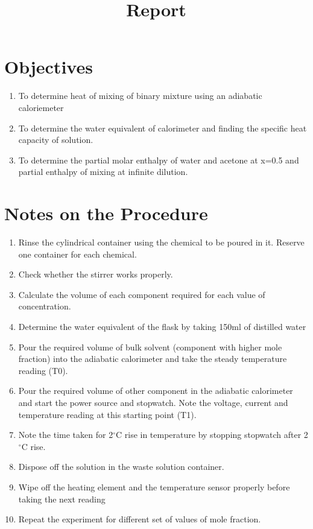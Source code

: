 \documentclass[11pt]{article}
\title{Report}
\date{}
\providecommand{\tightlist}{%
      \setlength{\itemsep}{0pt}\setlength{\parskip}{0pt}}
\begin{document}
\setcounter{page}{2}

\hypertarget{objectives}{%
  \section{Objectives}\label{objectives}}

\begin{enumerate}
  \def\labelenumi{\arabic{enumi}.}
  \item
        To determine heat of mixing of binary mixture using an adiabatic
        caloriemeter
  \item
        To determine the water equivalent of calorimeter and finding the
        specific heat capacity of solution.
  \item
        To determine the partial molar enthalpy of water and acetone at x=0.5
        and partial enthalpy of mixing at infinite dilution.
\end{enumerate}

\hypertarget{notes-on-the-procedure}{%
  \section{Notes on the Procedure}\label{notes-on-the-procedure}}

\begin{enumerate}
  \def\labelenumi{\arabic{enumi}.}
  \tightlist
  \item
        Rinse the cylindrical container using the chemical to be poured in it.
        Reserve one container for each chemical.
  \item
        Check whether the stirrer works properly.
  \item
        Calculate the volume of each component required for each value of
        concentration.
  \item
        Determine the water equivalent of the flask by taking 150ml of
        distilled water
  \item
        Pour the required volume of bulk solvent (component with higher mole
        fraction) into the adiabatic calorimeter and take the steady
        temperature reading (T0).~
  \item
        Pour the required volume of other component in the adiabatic
        calorimeter and start the power source and stopwatch. Note the
        voltage, current and temperature reading at this starting point (T1).
  \item
        Note the time taken for 2\(^{\circ}\)C rise in temperature by stopping
        stopwatch after 2\(^{\circ}\)C rise.
  \item
        Dispose off the solution in the waste solution container.
  \item
        Wipe off the heating element and the temperature sensor properly
        before taking the next reading
  \item
        Repeat the experiment for different set of values of mole fraction.~
\end{enumerate}
\end{document}

